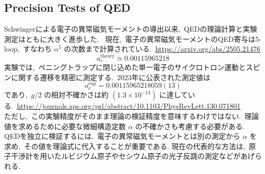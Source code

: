 \documentclass[uplatex,dvipdfmx,a4paper,11pt]{jsarticle}
\begin{document}
\subsection{Precision Tests of QED}
Schwingerによる電子の異常磁気モーメントの導出以来,~QEDの理論計算と実験測定はともに大きく進歩した.~
現在,~電子の異常磁気モーメントのQED寄与は5-loop,~すなわち \(\alpha^5\) の次数まで計算されている.~\url{https://arxiv.org/abs/2505.21476}
\[
a_e^{\mathrm{theory}}
\simeq 0.00115965218
\]
実験では,~ペニングトラップに閉じ込めた単一電子のサイクロトロン運動とスピンに関する遷移を精密に測定する.~2023年に公表された測定値は
\[
a_e^{\mathrm{exp}}
=0.00115965218059(13)
\]
であり,~$g/2$ の相対不確かさは約 $(1.3\times10^{-13})$ に達している.~\url{https://journals.aps.org/prl/abstract/10.1103/PhysRevLett.130.071801}\\
ただし,~この実験精度がそのまま理論の検証精度を意味するわけではない.~理論値を求めるために必要な微細構造定数 $\alpha$ の不確かさも考慮する必要がある.
QEDを独立に検証するには,~電子の異常磁気モーメントとは別の測定から $\alpha$ を求め,~その値を理論式に代入することが重要である.
現在の代表的な方法は,~原子干渉計を用いたルビジウム原子やセシウム原子の光子反跳の測定などがあげられる.~\\
\end{document}
